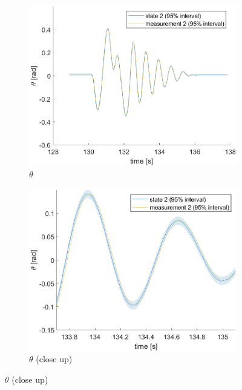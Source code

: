 \documentclass[a4paper,kul]{kulakarticle} %
\begin{document}
\begin{figure}[htp!]
\begin{subfigure}[b]{0.48\textwidth}
		\includegraphics[width=\textwidth]{state2_w.eps}
		\caption{$\theta$}
	\end{subfigure}
	\hfill
	\begin{subfigure}[b]{0.48\textwidth}  
		\centering 
		\includegraphics[width=\textwidth]{state2_w_closeup.eps}
		\caption{$\theta$ (close up)}
	\end{subfigure}
	

\end{figure}
\end{document}
